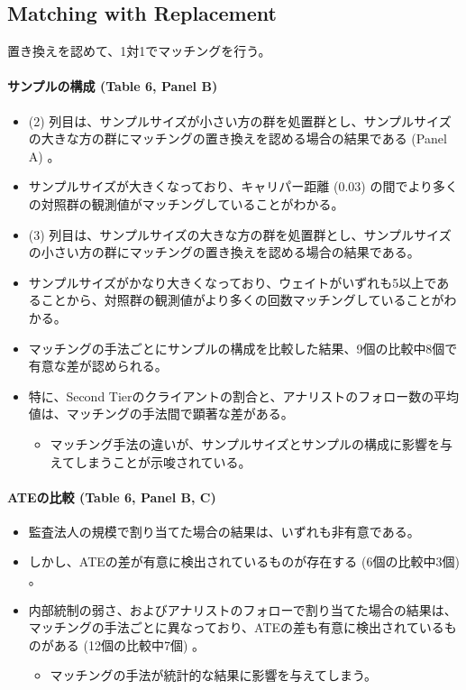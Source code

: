 \subsection*{Matching with Replacement}

置き換えを認めて、1対1でマッチングを行う。

\paragraph{サンプルの構成 (Table 6, Panel B) }

\begin{itemize}
 \item  (2) 列目は、サンプルサイズが小さい方の群を処置群とし、サンプルサイズの大きな方の群にマッチングの置き換えを認める場合の結果である (Panel A) 。
 \item サンプルサイズが大きくなっており、キャリパー距離 (0.03) の間でより多くの対照群の観測値がマッチングしていることがわかる。
 \item  (3) 列目は、サンプルサイズの大きな方の群を処置群とし、サンプルサイズの小さい方の群にマッチングの置き換えを認める場合の結果である。
 \item サンプルサイズがかなり大きくなっており、ウェイトがいずれも5以上であることから、対照群の観測値がより多くの回数マッチングしていることがわかる。
 \item マッチングの手法ごとにサンプルの構成を比較した結果、9個の比較中8個で有意な差が認められる。
 \item 特に、Second Tierのクライアントの割合と、アナリストのフォロー数の平均値は、マッチングの手法間で顕著な差がある。
  \begin{itemize}
   \item マッチング手法の違いが、サンプルサイズとサンプルの構成に影響を与えてしまうことが示唆されている。
  \end{itemize}
\end{itemize}

\paragraph{ATEの比較 (Table 6, Panel B, C) }

\begin{itemize}
 \item 監査法人の規模で割り当てた場合の結果は、いずれも非有意である。
 \item しかし、ATEの差が有意に検出されているものが存在する (6個の比較中3個) 。
 \item 内部統制の弱さ、およびアナリストのフォローで割り当てた場合の結果は、マッチングの手法ごとに異なっており、ATEの差も有意に検出されているものがある (12個の比較中7個) 。
  \begin{itemize}
   \item マッチングの手法が統計的な結果に影響を与えてしまう。
  \end{itemize}
\end{itemize}

